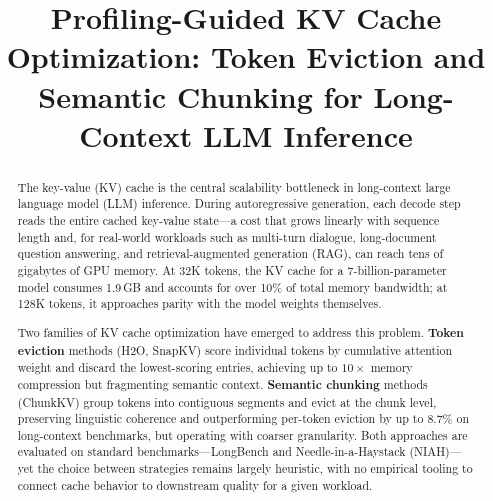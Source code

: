 \documentclass[conference]{IEEEtran}
\begin{document}
\title{Profiling-Guided KV Cache Optimization: Token Eviction and Semantic Chunking for Long-Context LLM Inference}

\author{
}

\maketitle

\begin{abstract}
The key-value (KV) cache is the central scalability bottleneck in long-context large language model (LLM) inference. During autoregressive generation, each decode step reads the entire cached key-value state---a cost that grows linearly with sequence length and, for real-world workloads such as multi-turn dialogue, long-document question answering, and retrieval-augmented generation (RAG), can reach tens of gigabytes of GPU memory. At 32K tokens, the KV cache for a 7-billion-parameter model consumes 1.9\,GB and accounts for over 10\% of total memory bandwidth; at 128K tokens, it approaches parity with the model weights themselves.

Two families of KV cache optimization have emerged to address this problem. \textbf{Token eviction} methods (H2O, SnapKV) score individual tokens by cumulative attention weight and discard the lowest-scoring entries, achieving up to $10\times$ memory compression but fragmenting semantic context. \textbf{Semantic chunking} methods (ChunkKV) group tokens into contiguous segments and evict at the chunk level, preserving linguistic coherence and outperforming per-token eviction by up to 8.7\% on long-context benchmarks, but operating with coarser granularity. Both approaches are evaluated on standard benchmarks---LongBench and Needle-in-a-Haystack (NIAH)---yet the choice between strategies remains largely heuristic, with no empirical tooling to connect cache behavior to downstream quality for a given workload.


\end{abstract}
\end{document}
